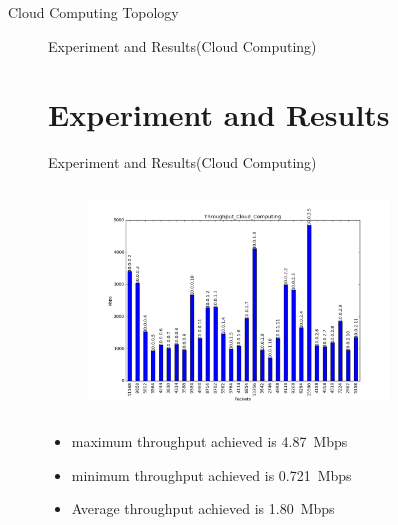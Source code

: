 \documentclass{beamer}
\begin{document}
\begin{frame}{Cloud Computing Topology}
\begin{figure}
\begin{frame}{Experiment and Results\big(Cloud Computing\big)}
\end{frame}
\section{Experiment and Results}
\begin{frame}{Experiment and Results\big(Cloud Computing\big)}
\begin{figure}
\includegraphics[width=8cm, height=6cm]{cloudth}
\centering
\end{figure}
\begin{itemize}

	\item maximum throughput achieved is \SI{4.87}Mbps
	\item minimum throughput achieved is \SI{0.721}Mbps
	\item Average throughput achieved is \SI{1.80}Mbps
\end{itemize}

\end{frame}

\end{figure}
\end{frame}
\end{document}
